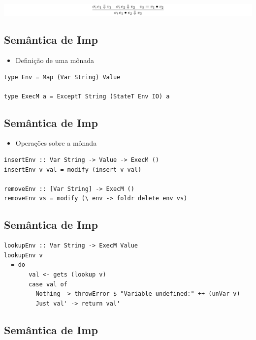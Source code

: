 \documentclass[11pt]{article}
\begin{document}
\begin{center}
\includegraphics[width=.9\linewidth]{./imgs/image2.png}
\end{center}
\subsection*{Semântica de Imp}
\label{sec:org9ec28c0}

\begin{itemize}
\item Definição de uma mônada
\end{itemize}

\begin{verbatim}
type Env = Map (Var String) Value

type ExecM a = ExceptT String (StateT Env IO) a
\end{verbatim}
\subsection*{Semântica de Imp}
\label{sec:org04632d4}

\begin{itemize}
\item Operações sobre a mônada
\end{itemize}

\begin{verbatim}
insertEnv :: Var String -> Value -> ExecM ()
insertEnv v val = modify (insert v val)

removeEnv :: [Var String] -> ExecM ()
removeEnv vs = modify (\ env -> foldr delete env vs)
\end{verbatim}
\subsection*{Semântica de Imp}
\label{sec:org0f70320}

\begin{verbatim}
lookupEnv :: Var String -> ExecM Value
lookupEnv v
  = do
       val <- gets (lookup v)
       case val of
         Nothing -> throwError $ "Variable undefined:" ++ (unVar v)
         Just val' -> return val'
\end{verbatim}
\subsection*{Semântica de Imp}
\label{sec:org4d1357a}
\end{document}
